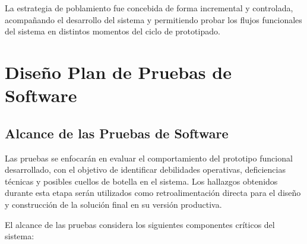 \documentclass[12pt]{article}
\begin{document}
La estrategia de poblamiento fue concebida de forma incremental y controlada, acompañando el desarrollo del sistema y permitiendo probar los flujos funcionales del sistema en distintos momentos del ciclo de prototipado.

\clearpage
\section{Diseño Plan de Pruebas de Software}
\subsection{Alcance de las Pruebas de Software}\label{subsec:alcance_pruebas}

Las pruebas se enfocarán en evaluar el comportamiento del prototipo funcional desarrollado, con el objetivo de identificar debilidades operativas, deficiencias técnicas y posibles cuellos de botella en el sistema. Los hallazgos obtenidos durante esta etapa serán utilizados como retroalimentación directa para el diseño y construcción de la solución final en su versión productiva.

El alcance de las pruebas considera los siguientes componentes críticos del sistema:
\end{document}
